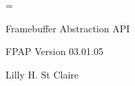 \footline={}

\null\vfill
\centerline{\fpf Framebuffer Abstraction API}
\medskip
\centerline{\fpf FPAP Version 03.01.05}
\medskip
\centerline{\fpf Lilly H. St Claire}
\vfill\break
